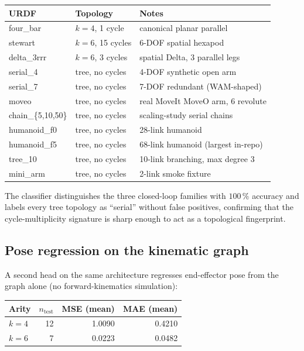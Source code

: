 \documentclass[11pt,a4paper]{article}
\begin{document}
\begin{center}
\begin{tabular}{lll}
\toprule
URDF                & Topology                & Notes                                \\
\midrule
four\_bar           & $k = 4$, 1 cycle        & canonical planar parallel            \\
stewart             & $k = 6$, 15 cycles      & 6-DOF spatial hexapod                \\
delta\_3rrr         & $k = 6$, 3 cycles       & spatial Delta, 3 parallel legs       \\
serial\_4           & tree, no cycles         & 4-DOF synthetic open arm             \\
serial\_7           & tree, no cycles         & 7-DOF redundant (WAM-shaped)         \\
moveo               & tree, no cycles         & real MoveIt MoveO arm, 6 revolute    \\
chain\_\{5,10,50\}  & tree, no cycles         & scaling-study serial chains          \\
humanoid\_f0        & tree, no cycles         & 28-link humanoid                     \\
humanoid\_f5        & tree, no cycles         & 68-link humanoid (largest in-repo)   \\
tree\_10            & tree, no cycles         & 10-link branching, max degree 3      \\
mini\_arm           & tree, no cycles         & 2-link smoke fixture                 \\
\bottomrule
\end{tabular}
\end{center}

The classifier distinguishes the three closed-loop families with
$100\,\%$ accuracy and labels every tree topology as ``serial''
without false positives, confirming that the cycle-multiplicity
signature is sharp enough to act as a topological fingerprint.

\subsection{Pose regression on the kinematic graph}

A second head on the same architecture regresses end-effector pose
from the graph alone (no forward-kinematics simulation):

\begin{center}
\begin{tabular}{lrrr}
\toprule
Arity   & $n_\text{test}$ & MSE (mean) & MAE (mean) \\
\midrule
$k = 4$ & 12              & 1.0090     & 0.4210     \\
$k = 6$ & 7               & 0.0223     & 0.0482     \\
\bottomrule
\end{tabular}
\end{center}
\end{document}
